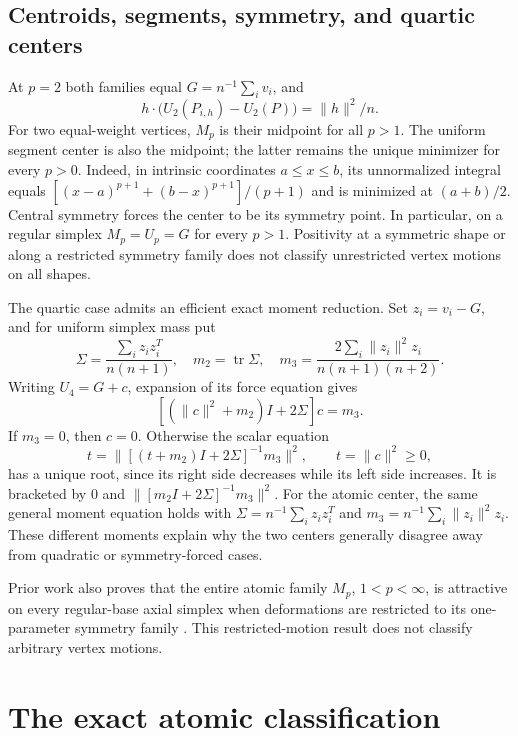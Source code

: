 \documentclass[11pt]{article}
\theoremstyle{definition}
\newcommand{\tr}{\operatorname{tr}}
\begin{document}
\subsection{Centroids, segments, symmetry, and quartic centers}
At $p=2$ both families equal $G=n^{-1}\sum_i v_i$, and
\begin{equation}\label{eq:quadratic}
 h\cdot\bigl(U_2(P_{i,h})-U_2(P)\bigr)=\|h\|^2/n.
\end{equation}
For two equal-weight vertices, $M_p$ is their midpoint for all $p>1$.
The uniform segment center is also the midpoint; the latter remains the
unique minimizer for every $p>0$. Indeed, in intrinsic coordinates
$a\le x\le b$, its unnormalized integral equals
$[(x-a)^{p+1}+(b-x)^{p+1}]/(p+1)$ and is minimized at $(a+b)/2$.
Central symmetry forces the center to be its symmetry point. In particular,
on a regular simplex $M_p=U_p=G$ for every $p>1$. Positivity at a symmetric
shape or along a restricted symmetry family does not classify unrestricted
vertex motions on all shapes.

The quartic case admits an efficient exact moment reduction. Set
$z_i=v_i-G$, and for uniform simplex mass put
\begin{equation}\label{eq:quarticmoments}
 \Sigma=\frac{\sum_i z_i z_i^T}{n(n+1)},\quad
 m_2=\tr\Sigma,\quad
 m_3=\frac{2\sum_i\|z_i\|^2z_i}{n(n+1)(n+2)}.
\end{equation}
Writing $U_4=G+c$, expansion of its force equation gives
\begin{equation}\label{eq:quartic}
 [ (\|c\|^2+m_2)I+2\Sigma]c=m_3.
\end{equation}
If $m_3=0$, then $c=0$. Otherwise the scalar equation
\[
 t=\|[(t+m_2)I+2\Sigma]^{-1}m_3\|^2,
 \qquad t=\|c\|^2\ge0,
\]
has a unique root, since its right side decreases while its left side
increases. It is bracketed by $0$ and
$\|[m_2I+2\Sigma]^{-1}m_3\|^2$. For the atomic center, the same general
moment equation holds with
$\Sigma=n^{-1}\sum_i z_i z_i^T$ and
$m_3=n^{-1}\sum_i\|z_i\|^2z_i$. These different moments explain why
the two centers generally disagree away from quadratic or symmetry-forced
cases.

Prior work also proves that the entire atomic family $M_p$, $1<p<\infty$,
is attractive on every regular-base axial simplex when deformations are
restricted to its one-parameter symmetry family \cite{PaperIII}. This
restricted-motion result does not classify arbitrary vertex motions.

\section{The exact atomic classification}
\end{document}

